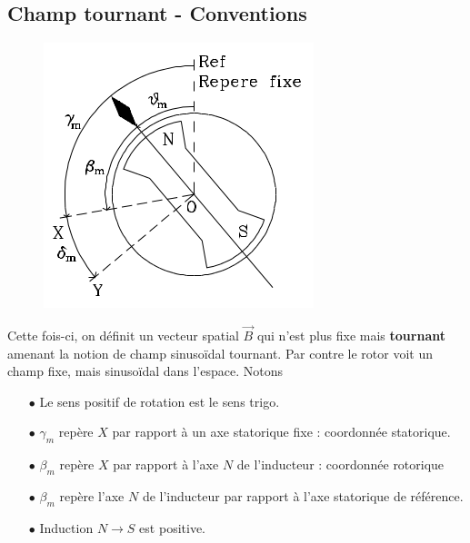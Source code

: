 	\subsection{Champ tournant - Conventions}
	\begin{figure}
	\includegraphics[scale=0.38]{ch5/image3.png}
	\end{figure}
	Cette fois-ci, on définit un vecteur spatial $\vec{B}$ qui n'est plus fixe 
	mais \textbf{tournant} amenant la notion de champ sinusoïdal tournant. Par 
	contre le rotor voit un champ fixe, mais sinusoïdal dans l'espace. Notons 
	\begin{itemize}
	\item[$\bullet$] Le sens positif de rotation est le sens trigo.
	\item[$\bullet$] $\gamma_m$ repère $X$ par rapport à un axe statorique 
	fixe : coordonnée statorique.
	\item[$\bullet$] $\beta_m$ repère $X$ par rapport à l'axe $N$ de l'inducteur :
	coordonnée rotorique
	\item[$\bullet$] $\beta_m$ repère l'axe $N$ de l'inducteur par rapport à 
	l'axe statorique de référence.
	\item[$\bullet$] Induction $N \rightarrow S$ est positive.		
	\end{itemize}
	
	
